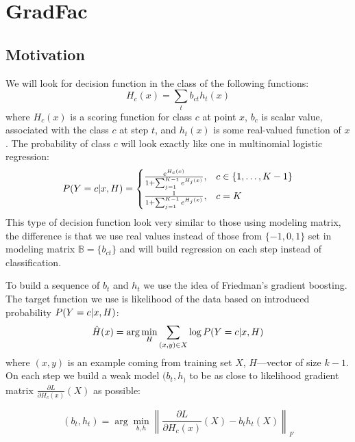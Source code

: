 \documentclass{article}
\begin{document}
\section{GradFac}

\subsection{Motivation}
We will look for decision function in the class of the following functions:
$$
H_c(x) = \sum_t b_{ct} h_t(x) 
$$
where $H_c(x)$ is a scoring function for class $c$ at point $x$, $b_c$ is scalar value, associated with the class $c$ at step $t$, and $h_t(x)$ is some real-valued function of $x$. The probability of class $c$ will look exactly like one in multinomial logistic regression:
\begin{equation}
  P(Y = c \arrowvert x, H) =
  \begin{cases}
    \frac{ e^{H_{c}(x)} }
       { 1+\sum_{j=1}^{K-1} e^{H_{j}(x)} }
    , & c \in \{1, \ldots, K-1 \} \\

    \frac{ 1 }
       { 1 + \sum_{j=1}^{K-1} e^{H_{j}(x)} }
    , & c=K
  \end{cases}
\end{equation}
This type of decision function look very similar to those using modeling matrix, the difference is that we use real values instead of those from $\{-1,0,1\}$ set in modeling matrix $\mathbb{B} = \{b_{ct}\}$ and will build regression on each step instead of classification.

To build a sequence of $b_t$ and $h_t$ we use the idea of Friedman's gradient boosting. The target function we use is likelihood of the data based on introduced probability $P(Y = c \arrowvert x, H)$:
$$
\hat{H}(x) = \arg \min_H \sum_{(x,y) \in X} \log P(Y = c \arrowvert x, H)
$$
where $(x,y)$ is an example coming from training set $X$, $H$---vector of size $k-1$. On each step we build a weak model $(b_t, h_)$ to be as close to likelihood gradient matrix $\frac{\partial L}{\partial H_c(x)}\left(X\right)$ as possible:

$$
(b_t, h_t) = \arg \min_{b,h} \left\|\frac{\partial L}{\partial H_c(x)}\left(X\right) - b_t h_t(X)\right\|_F
$$


\end{document}
